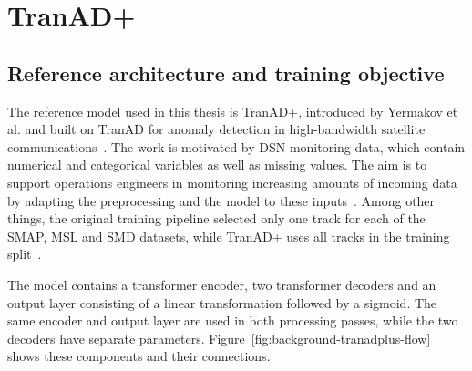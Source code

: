 \section{TranAD+}
\label{sec:background-tranadplus}

\subsection{Reference architecture and training objective}
\label{sec:background-tranadplus-training}

The reference model used in this thesis is TranAD+, introduced
by Yermakov et al. and built on TranAD for anomaly detection
in high-bandwidth satellite communications~\cite{Yermakov2025TranADPlus}.
The work is motivated by DSN monitoring data, which contain
numerical and categorical variables as well as missing values.
The aim is to support operations engineers in monitoring increasing
amounts of incoming data by adapting the preprocessing and the
model to these inputs~\cite{Yermakov2025TranADPlus}.
Among other things, the original training pipeline selected only
one track for each of the SMAP, MSL and SMD datasets, while TranAD+
uses all tracks in the training
split~\cite{TranADReferenceCode,TranADPlusReferenceCode}.

The model contains a transformer encoder, two transformer decoders
and an output layer consisting of a linear transformation followed
by a sigmoid. The same encoder and output layer are used in both
processing passes, while the two decoders have separate parameters.
Figure~\ref{fig:background-tranadplus-flow} shows these components
and their connections.

